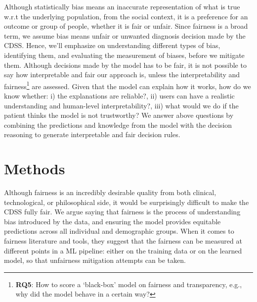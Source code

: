 \hspace*{3.5mm} Although statistically bias means an inaccurate representation of what is true w.r.t the underlying population, from the social context, it is a preference for an outcome or group of people, whether it is fair or unfair. Since fairness is a broad term, we assume bias means unfair or unwanted diagnosis decision made by the CDSS. Hence, we'll emphasize on understanding different types of bias, identifying them, and evaluating the measurement of biases, before we mitigate them. Although decisions made by the model has to be fair, it is not possible to say how interpretable and fair our approach is, unless the interpretability and fairness\footnote{\textbf{RQ5}: How to score a `black-box' model on fairness and transparency, e.g., why did the model behave in a certain way?} are assessed. Given that the model can explain how it works, how do we know whether: i) the explanations are reliable?, ii) users can have a realistic understanding and human-level interpretability?, iii) what would we do if the patient thinks the model is not trustworthy? We answer above questions by combining the predictions and knowledge from the model with the decision reasoning to generate interpretable and fair decision rules. 


\section{Methods} \label{chapter_9:mm}
Although fairness is an incredibly desirable quality from both clinical, technological, or philosophical side, it would be surprisingly difficult to make the CDSS fully fair. We argue saying that fairness is the process of understanding bias introduced by the data, and ensuring the model provides equitable predictions across all individual and demographic groups. When it comes to fairness literature and tools, they suggest that the fairness can be measured at different points in a ML pipeline: either on the training data or on the learned model, so that unfairness mitigation attempts can be taken. 

